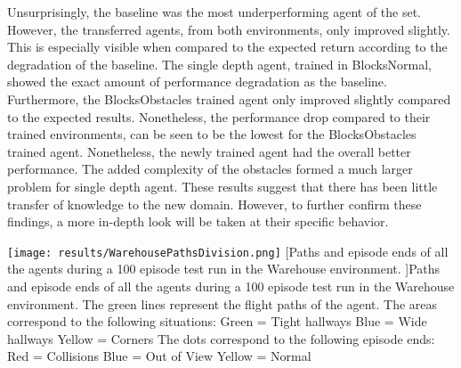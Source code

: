 Unsurprisingly, the baseline was the most underperforming agent of the set. However, 
the transferred agents, from both environments, only improved slightly. This is 
especially visible when compared to the expected return according to the degradation 
of the baseline. The single depth agent, trained in BlocksNormal, showed the exact 
amount of performance degradation as the baseline. Furthermore, the BlocksObstacles 
trained agent only improved slightly compared to the expected results. Nonetheless, 
the performance drop compared to their trained environments, can be seen to be the 
lowest for the BlocksObstacles trained agent. Nonetheless, the newly 
trained agent had the overall better performance. The added complexity of the 
obstacles formed a much larger problem for single depth agent. These results 
suggest that there has been little transfer of knowledge to the new domain. 
However, to further confirm these findings, a more in-depth look will be taken 
at their specific behavior. 


\begin{SCfigure}[][h]
    \centering
    \texttt{[image: results/WarehousePathsDivision.png]}
    [Paths and episode ends of all the agents during a 100 episode test run in the Warehouse environment. ]{Paths and episode ends of all the agents during a 100 episode test run in the Warehouse environment. 
    The green lines represent the flight paths of the agent.\newline\newline\newline\newline\newline\newline\newline\newline
    The areas correspond to the following situations: \newline
    Green = Tight hallways\newline
    Blue = Wide hallways \newline
    Yellow = Corners \newline\newline
    The dots correspond to the following episode ends: \newline
    Red = Collisions\newline
    Blue = Out of View \newline
    Yellow = Normal}
    \label{im:FactoryPathsDivided}
\end{SCfigure}

